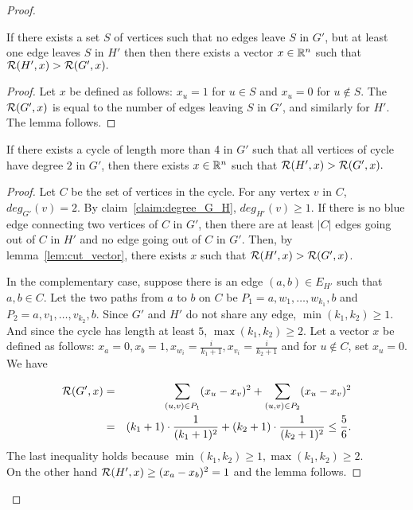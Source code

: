 \begin{proof}
\begin{lemma}\label{lem:cut_vector}
If there exists a set $S$ of vertices such that no edges leave $S$ in $G'$, but at least one edge leaves $S$ in $H'$ then then there exists a vector $x \in \mathbb{R}^n$ such that ${\cal R}(H',x)> {\cal R}(G',x).$
\end{lemma}
\begin{proof}
Let $x$ be defined as follows: $x_u = 1$ for $u \in S$ and $x_u = 0$ for $u \not \in S$. The ${\cal R}(G',x)$ is equal to the number of edges leaving $S$ in $G'$, and similarly for $H'$. The lemma follows. 
\end{proof}

\begin{lemma}\label{lem:cycle_length_5}
If there exists a cycle of length more than 4 in $G'$ such that all vertices of cycle have degree $2$ in $G'$, then there exists $x \in \mathbb{R}^n$ such that ${\cal R}(H',x)> {\cal R}(G',x).$
\end{lemma}
\begin{proof}
Let $C$ be the set of vertices in the cycle. For any vertex $v$ in $C$, $deg_{G'}(v) = 2$. By claim~\ref{claim:degree_G_H}, $deg_{H'}(v) \geq 1$. If there is no blue edge connecting two vertices of $C$ in $G'$, then there are at least $|C|$ edges going out of $C$ in $H'$ and no edge going out of $C$ in $G'$. Then, by lemma~\ref{lem:cut_vector}, there exists $x$ such that ${\cal R}(H',x)> {\cal R}(G',x)$. 

In the complementary case, suppose there is an edge $(a,b) \in E_{H'}$ such that $a,b \in C$. Let the two paths from $a$ to $b$ on $C$ be $P_1 = a,w_1,\dots,w_{k_1},b$ and $P_2 = a,v_1,\dots,v_{k_2},b$. Since $G'$ and $H'$ do not share any edge, $\min(k_1,k_2) \geq 1$. And since the cycle has length at least $5$, $\max(k_1,k_2) \geq 2$. Let a vector $x$ be defined as follows: $x_{a} = 0, x_b = 1, x_{w_i} = \frac{i}{k_1+1}, x_{v_i} = \frac{i}{k_2+1}$ and for $u \not \in C$, set $x_u = 0$. We have

\begin{eqnarray*}
{\cal R}(G',x) & = & \sum_{(u,v) \in P_1} (x_u - x_v)^2 + \sum_{(u,v) \in P_2} (x_u-x_v)^2 \\
& = & (k_1+1)\cdot \frac{1}{(k_1+1)^2} + (k_2+1)\cdot \frac{1}{(k_2+1)^2} \leq  \frac{5}{6}.
\end{eqnarray*}
The last inequality holds because $\min(k_1,k_2) \geq 1, \max(k_1,k_2) \geq 2$. \\ On the other hand
${\cal R}(H',x) \geq (x_a-x_b)^2 =1 $ and the lemma follows. 
\end{proof}



\end{proof}
